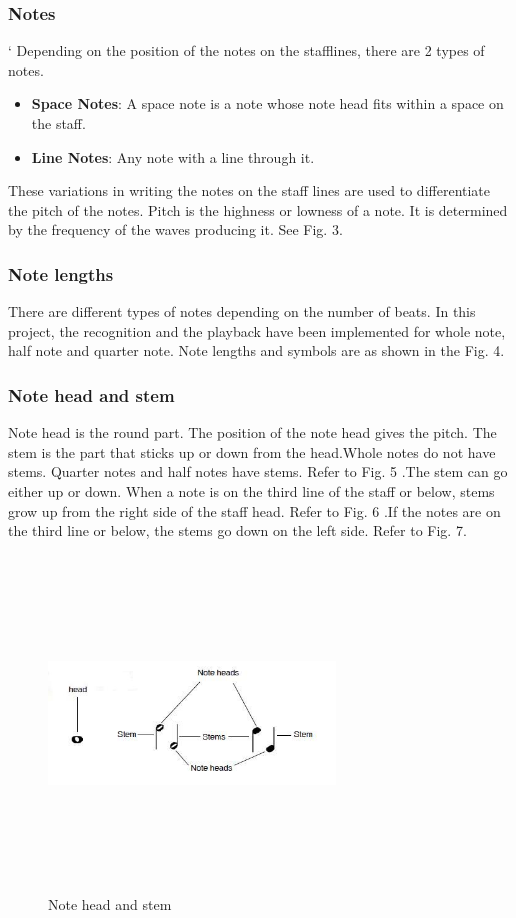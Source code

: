 \documentclass[journal]{IEEEtran}
\begin{document}
\subsubsection{Notes}`
Depending on the position of the notes on the stafflines, there are 2 types of notes. 
\begin{itemize}
  \item \textbf{Space Notes}: A space note is a note whose note head fits within a space on the staff.
  \item \textbf{Line Notes}: Any note with a line through it.
\end{itemize}
These variations in writing the notes on the staff lines are used to differentiate the pitch of the
notes. Pitch is the highness or lowness of a note. It is determined by the frequency of the waves
producing it. See Fig. 3.

\subsubsection{Note lengths}
There are different types of notes depending on the number of beats. In this
project, the recognition and the playback have been implemented for whole note, half note
and quarter note. Note lengths and symbols are as shown in the Fig. 4.

\subsubsection{Note head and stem}
Note head is the round part. The position of the note head gives the
pitch. The stem is the part that sticks up or down from the head.Whole notes do not have
stems. Quarter notes and half notes have stems. Refer to Fig. 5 .The stem can go either up or down. When a note is on the third line of the staff or below, stems grow up from the right side of the staff head. Refer to Fig. 6 .If the notes are on the third line or below, the stems go down on the left side. Refer to Fig. 7.

\begin{figure}
\includegraphics[width=3in,height=3.5in,clip,keepaspectratio]{resources/images/note_head_stem}
\centering
\caption{Note head and stem}
\end{figure}
\end{document}
